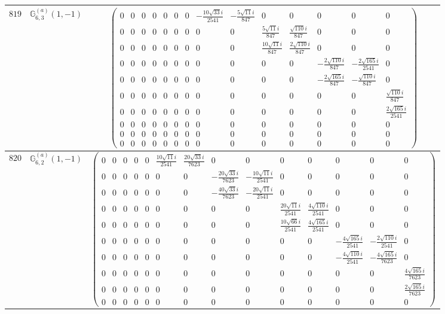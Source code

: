 \documentclass[fleqn,8pt,landscape]{jsarticle}
\begin{document}
\begin{center}
\begin{longtable}{ccc}
$ 819 $ & $ \mathbb{G}_{6,3}^{(a)}(1,-1) $ & $ \begin{pmatrix} 0 & 0 & 0 & 0 & 0 & 0 & 0 & - \frac{10 \sqrt{33} i}{2541} & - \frac{5 \sqrt{11} i}{847} & 0 & 0 & 0 & 0 & 0 \\ 0 & 0 & 0 & 0 & 0 & 0 & 0 & 0 & 0 & \frac{5 \sqrt{11} i}{847} & \frac{\sqrt{110} i}{847} & 0 & 0 & 0 \\ 0 & 0 & 0 & 0 & 0 & 0 & 0 & 0 & 0 & \frac{10 \sqrt{11} i}{847} & \frac{2 \sqrt{110} i}{847} & 0 & 0 & 0 \\ 0 & 0 & 0 & 0 & 0 & 0 & 0 & 0 & 0 & 0 & 0 & - \frac{2 \sqrt{110} i}{847} & - \frac{2 \sqrt{165} i}{2541} & 0 \\ 0 & 0 & 0 & 0 & 0 & 0 & 0 & 0 & 0 & 0 & 0 & - \frac{2 \sqrt{165} i}{847} & - \frac{\sqrt{110} i}{847} & 0 \\ 0 & 0 & 0 & 0 & 0 & 0 & 0 & 0 & 0 & 0 & 0 & 0 & 0 & \frac{\sqrt{110} i}{847} \\ 0 & 0 & 0 & 0 & 0 & 0 & 0 & 0 & 0 & 0 & 0 & 0 & 0 & \frac{2 \sqrt{165} i}{2541} \\ 0 & 0 & 0 & 0 & 0 & 0 & 0 & 0 & 0 & 0 & 0 & 0 & 0 & 0 \\ 0 & 0 & 0 & 0 & 0 & 0 & 0 & 0 & 0 & 0 & 0 & 0 & 0 & 0 \\ 0 & 0 & 0 & 0 & 0 & 0 & 0 & 0 & 0 & 0 & 0 & 0 & 0 & 0 \end{pmatrix} $ \\ \hline
$ 820 $ & $ \mathbb{G}_{6,2}^{(a)}(1,-1) $ & $ \begin{pmatrix} 0 & 0 & 0 & 0 & 0 & \frac{10 \sqrt{11} i}{2541} & \frac{20 \sqrt{33} i}{7623} & 0 & 0 & 0 & 0 & 0 & 0 & 0 \\ 0 & 0 & 0 & 0 & 0 & 0 & 0 & - \frac{20 \sqrt{33} i}{7623} & - \frac{10 \sqrt{11} i}{2541} & 0 & 0 & 0 & 0 & 0 \\ 0 & 0 & 0 & 0 & 0 & 0 & 0 & - \frac{40 \sqrt{33} i}{7623} & - \frac{20 \sqrt{11} i}{2541} & 0 & 0 & 0 & 0 & 0 \\ 0 & 0 & 0 & 0 & 0 & 0 & 0 & 0 & 0 & \frac{20 \sqrt{11} i}{2541} & \frac{4 \sqrt{110} i}{2541} & 0 & 0 & 0 \\ 0 & 0 & 0 & 0 & 0 & 0 & 0 & 0 & 0 & \frac{10 \sqrt{66} i}{2541} & \frac{4 \sqrt{165} i}{2541} & 0 & 0 & 0 \\ 0 & 0 & 0 & 0 & 0 & 0 & 0 & 0 & 0 & 0 & 0 & - \frac{4 \sqrt{165} i}{2541} & - \frac{2 \sqrt{110} i}{2541} & 0 \\ 0 & 0 & 0 & 0 & 0 & 0 & 0 & 0 & 0 & 0 & 0 & - \frac{4 \sqrt{110} i}{2541} & - \frac{4 \sqrt{165} i}{7623} & 0 \\ 0 & 0 & 0 & 0 & 0 & 0 & 0 & 0 & 0 & 0 & 0 & 0 & 0 & \frac{4 \sqrt{165} i}{7623} \\ 0 & 0 & 0 & 0 & 0 & 0 & 0 & 0 & 0 & 0 & 0 & 0 & 0 & \frac{2 \sqrt{165} i}{7623} \\ 0 & 0 & 0 & 0 & 0 & 0 & 0 & 0 & 0 & 0 & 0 & 0 & 0 & 0 \end{pmatrix} $ \\ \hline

\end{longtable}
\end{center}
\end{document}

